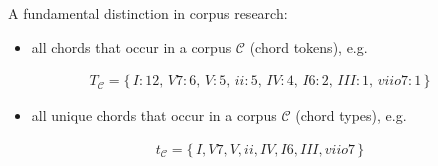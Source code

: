\begin{frame}
{
  }
\end{frame}

\begin{frame}{\insertsectionhead}
  A fundamental distinction in corpus research:

  \begin{itemize}
    \item \alert{all chords} that occur in a corpus $\mathcal C$ (chord tokens), e.g.
  \end{itemize}
  \begin{align*}
    T_{\mathcal C} = \{\, I : 12,\, V7 : 6,\, V : 5,\, ii : 5,\, IV : 4,\, I6 : 2,\, III : 1,\, viio7 : 1\,\}
  \end{align*}
  \pause
  \begin{itemize}
    \item \alert{all unique chords} that occur in a corpus $\mathcal C$ (chord types), e.g.
  \end{itemize}
  \begin{align*}
    t_{\mathcal C} = \{\, I, V7, V, ii, IV, I6, III, viio7 \,\}
  \end{align*}
\end{frame}


